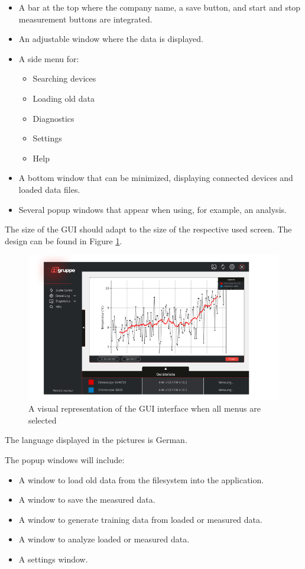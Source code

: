 \documentclass[]{scrreprt}
\begin{document}
\begin{itemize}
\item A bar at the top where the company name, a save button, and start and stop measurement buttons are integrated.
\item An adjustable window where the data is displayed.
\item A side menu for:
\begin{itemize}
\item Searching devices
\item Loading old data
\item Diagnostics
\item Settings
\item Help
\end{itemize}
\item A bottom window that can be minimized, displaying connected devices and loaded data files.
\item Several popup windows that appear when using, for example, an analysis.
\end{itemize}

The size of the GUI should adapt to the size of the respective used screen. The design can be found in Figure \ref{fig:GUI}.

\begin{figure}[!h]
\includegraphics[width=.9\textwidth]{./assets/pictures/DatawindowVersion1.0.png}
\caption[]{A visual representation of the GUI interface when all menus are selected}
\label{fig:GUI}
\end{figure}

The language displayed in the pictures is German.

The popup windows will include:

\begin{itemize}
\item A window to load old data from the filesystem into the application.
\item A window to save the measured data.
\item A window to generate training data from loaded or measured data.
\item A window to analyze loaded or measured data.
\item A settings window.
\end{itemize}
\end{document}

